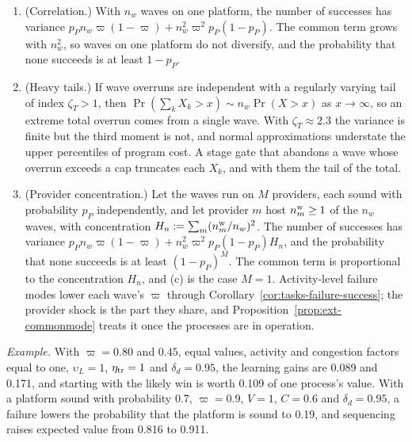 \begin{proposition}
\begin{enumerate}
\item[(c)] (Correlation.) With $n_w$ waves on one platform, the number of successes has variance $p_Pn_w\varpi(1-\varpi)+n_w^2\varpi^2p_P(1-p_P)$. The common term grows with $n_w^2$, so waves on one platform do not diversify, and the probability that none succeeds is at least $1-p_P$.
\item[(d)] (Heavy tails.) If wave overruns are independent with a regularly varying tail of index $\zeta_T>1$, then $\Pr(\sum_kX_k>x)\sim n_w\Pr(X>x)$ as $x\to\infty$, so an extreme total overrun comes from a single wave. With $\zeta_T\approx2.3$ the variance is finite but the third moment is not, and normal approximations understate the upper percentiles of program cost. A stage gate that abandons a wave whose overrun exceeds a cap truncates each $X_k$, and with them the tail of the total.
\item[(e)] (Provider concentration.) Let the waves run on $M$ providers, each sound with probability $p_P$ independently, and let provider $m$ host $n^{\rm w}_m\ge1$ of the $n_w$ waves, with concentration $H_n:=\sum_m(n^{\rm w}_m/n_w)^2$. The number of successes has variance $p_Pn_w\varpi(1-\varpi)+n_w^2\varpi^2p_P(1-p_P)H_n$, and the probability that none succeeds is at least $(1-p_P)^M$. The common term is proportional to the concentration $H_n$, and (c) is the case $M=1$. Activity-level failure modes lower each wave's $\varpi$ through Corollary~\ref{cor:tasks-failure-success}; the provider shock is the part they share, and Proposition~\ref{prop:ext-commonmode} treats it once the processes are in operation.
\end{enumerate}
\end{proposition}

\noindent\emph{Example.} With $\varpi=0.80$ and $0.45$, equal values, activity and congestion factors equal to one, $\upsilon_L=1$, $\eta_{\rm tr}=1$ and $\delta_d=0.95$, the learning gains are 0.089 and 0.171, and starting with the likely win is worth 0.109 of one process's value. With a platform sound with probability 0.7, $\varpi=0.9$, $V=1$, $C=0.6$ and $\delta_d=0.95$, a failure lowers the probability that the platform is sound to 0.19, and sequencing raises expected value from 0.816 to 0.911.

